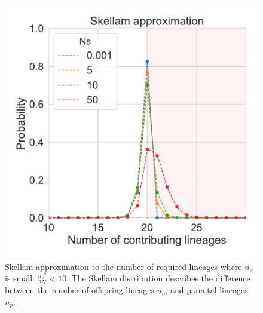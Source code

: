 \documentclass[9pt,twocolumn,twoside,lineno]{gsajnl}
\begin{document}
\begin{figure}
  \centering
  \includegraphics[width=\columnwidth]{fig/skellam.pdf}
  \caption{Skellam approximation to the number of required lineages where $n_o$ is small:
  $\frac{{n_o}^2}{2N} < 10$. The Skellam distribution describes the difference between the number
  of offspring lineages $n_o$, and parental lineages $n_p$. }
  \label{fig_apx_skellam}
\end{figure}
\end{document}
